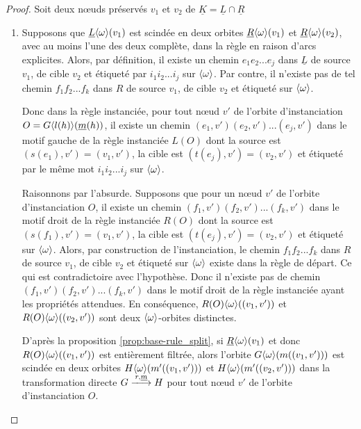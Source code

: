 \begin{proof}
	Soit deux n\oe uds préservés $v_1$ et $v_2$ de $\underline{K} = \underline{L} \cap \underline{R}$
	\begin{enumerate}
		\item Supposons que $\underline{L}\langle\omega\rangle(v_1)$ est scindée en deux
		      orbites $\underline{R}\langle\omega\rangle(v_1)$ et $\underline{R}\langle\omega\rangle(v_2)$, avec au moins l'une des deux complète, dans la
		      règle en raison d'arcs explicites. Alors, par définition, il existe un chemin
		      $e_1 e_2 ... e_j$ dans $\underline{L}$ de source $v_1$, de cible $v_2$ et étiqueté par
		      $i_1 i_2 ... i_j$ sur $\langle\omega\rangle$. Par contre, il n'existe pas de tel chemin
		      $f_1 f_2 ... f_k$ dans $R$ de source $v_1$, de cible $v_2$ et étiqueté sur
		      $\langle\omega\rangle$.

		      Donc dans la règle instanciée, pour tout n\oe ud $v'$ de l'orbite
		      d'instanciation $O = G\langle l(h)\rangle(\underline{m}(h))$, il existe un chemin
		      $(e_1,v') (e_2,v') ... (e_j,v')$ dans le motif gauche de la règle instanciée
		      $L(O)$ dont la source est $(s(e_1),v') = (v_1, v')$, la cible est
		      $(t(e_j), v') = (v_2, v')$ et étiqueté par le même mot $i_1 i_2 ... i_j$ sur
		      $\langle\omega\rangle$.

		      Raisonnons par l'absurde. %
		      Supposons que pour un n\oe ud $v'$ de l'orbite d'instanciation $O$, il
		      existe un chemin $(f_1,v') (f_2,v') ... (f_k,v')$ dans le motif droit de la
		      règle instanciée $R(O)$ dont la source est $(s(f_1),v') = (v_1, v')$, la cible
		      est $(t(e_j), v') = (v_2, v')$ et étiqueté sur $\langle\omega\rangle$. Alors, par
		      construction de l'instanciation, le chemin $f_1 f_2 ... f_k$ dans $R$ de source
		      $v_1$, de cible $v_2$ et étiqueté sur $\langle\omega\rangle$ existe dans la règle de
		      départ. Ce qui est contradictoire avec l'hypothèse. Donc il n'existe pas de
		      chemin $(f_1,v') (f_2,v') ... (f_k,v')$ dans le motif droit de la règle
		      instanciée ayant les propriétés attendues. En conséquence, $R(O)\langle\omega\rangle((v_1,v'))$ et
		      $R(O)\langle\omega\rangle((v_2,v'))$ sont deux $\langle\omega\rangle$-orbites distinctes.

		      D'après la proposition \ref{prop:base-rule_split}, si
		      $\underline{R}\langle\omega\rangle(v_1)$ et donc $R(O)\langle\omega\rangle((v_1, v'))$ est entièrement
		      filtrée, alors l'orbite $G\langle\omega\rangle(m((v_1,v')))$ est scindée en deux orbites
		      $H\langle\omega\rangle(m'((v_1, v')))$ et $H\langle\omega\rangle(m'((v_2, v')))$ dans la
		      transformation directe $G \xlongrightarrow{r,\underline{m}} H$ pour tout n\oe ud
		      $v'$ de l'orbite d'instanciation $O$. %


\end{enumerate}
\end{proof}

